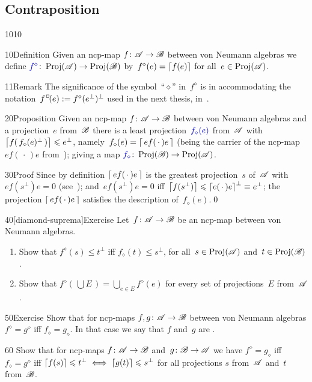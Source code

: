 \subsection{Contraposition}
\begin{parsec}{1010}%
\begin{point}{10}{Definition}%
Given an ncp-map $f\colon \mathscr{A}\to\mathscr{B}$
between von Neumann algebras
we define
$\Define{f^\diamond}\colon \Proj(\scrA)\to \Proj(\scrB)$%
by~$f^\diamond(e)=\left\lceil f(e)\right\rceil$
for all~$e\in\operatorname{Proj}(\mathscr{A})$.
\begin{point}{11}{Remark}%
The significance of the symbol~``$\diamond$''
in~$f^\diamond$
is in 
accommodating the notation~$f^\BOX(e):=f^\diamond(e^\perp)^\perp$
used
    in the next thesis, in~.
\end{point}
\end{point}
\begin{point}{20}{Proposition}%
Given an ncp-map $f\colon \mathscr{A}\to\mathscr{B}$
between von Neumann algebras
and a projection~$e$ from~$\mathscr{B}$
there is a least projection~$\Define{f_\diamond(e)}$ from~$\mathscr{A}$%
with~$\left\lceil f(\,f_\diamond(e)^\perp\,)\right\rceil\leqslant e^\perp$,
namely~$f_\diamond(e) =\left\lceil\,ef(\,\cdot\,)e\,\right\rceil$
(being the carrier 
	of the ncp-map $ef(\,\cdot\,)e$ from~);
giving a map $\Define{f_\diamond}\colon \Proj(\scrB)\to\Proj(\scrA)$.
\begin{point}{30}{Proof}%
Since by definition $\left\lceil\,ef(\,\cdot\,)e\,\right\rceil$
is the greatest projection~$s$ of~$\mathscr{A}$
with $ef(s^\perp)e=0$ (see~);
and~$ef(s^\perp )e=0$ iff~$\left\lceil f(s^\perp)\right\rceil
\leqslant\left\lceil e(\,\cdot\,)e\right\rceil^\perp\equiv
e^\perp$;
the projection
$\left\lceil\,ef(\,\cdot\,)e\,\right\rceil$
satisfies the description of~$f_\diamond(e)$.\qed
\end{point}
\end{point}
\begin{point}{40}[diamond-suprema]{Exercise}%
Let~$f\colon \mathscr{A}\to\mathscr{B}$ be an ncp-map between von Neumann algebras.
\begin{enumerate}
\item
Show that $f^\diamond(s)\leq t^\perp$
iff $f_\diamond(t)\leq s^\perp$,
for all~$s\in\operatorname{Proj}(\mathscr{A})$ and~$t\in\operatorname{Proj}(\mathscr{B})$.
\item
Show that $f^\diamond(\,\bigcup E\,)
= \bigcup_{e\in E} f^\diamond(e)$
for every set of projections~$E$ from~$\mathscr{A}$.
\end{enumerate}%
\spacingfix%
\end{point}%
\begin{point}{50}{Exercise}%
Show that for ncp-maps $f,g\colon\mathscr{A}\to\mathscr{B}$
between von Neumann algebras $f^\diamond = g^\diamond$
iff $f_\diamond = g_\diamond$.
In that case we say that $f$ and~$g$ are .%
\begin{point}{60}%
Show that for ncp-maps $f\colon \mathscr{A}\to\mathscr{B}$
and~$g\colon \mathscr{B}\to\mathscr{A}$ we have
$f^\diamond=g_\diamond$ iff $f_\diamond = g^\diamond$
iff $\left\lceil f(s)\right\rceil\leqslant t^\perp\iff \left\lceil g(t)\right\rceil\leqslant s^\perp$
for all projections $s$ from~$\mathscr{A}$ and~$t$ from~$\mathscr{B}$.


\end{point}
\end{point}
\end{parsec}

